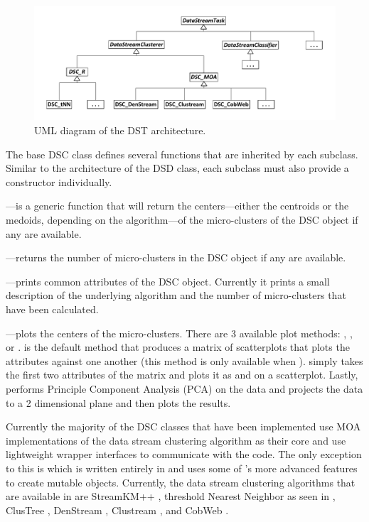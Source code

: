\documentclass[nojss]{jss}
\begin{document}
\begin{figure}
\centering
\includegraphics{dst_uml}
\caption{UML diagram of the DST architecture.}
\label{figure:dst}
\end{figure}

The base DSC class defines several functions that are inherited by each subclass. Similar to the architecture of the DSD class, each subclass must also provide a constructor individually.


%
---is a generic function that will return the centers---either the centroids or the medoids, depending on the algorithm---of the micro-clusters of the DSC object if any are available.


%
---returns the number of micro-clusters in the DSC object if any are available.


%
---prints common attributes of the DSC object. Currently it prints a small description of the underlying algorithm and the number of micro-clusters that have been calculated.


%
---plots the centers of the micro-clusters. There are 3 available plot methods: , , or .  is the default method that produces a matrix of scatterplots that plots the attributes against one another (this method is only available when ).  simply takes the first two attributes of the matrix and plots it as  and  on a scatterplot. Lastly,  performs Principle Component Analysis (PCA) on the data and projects the data to a 2 dimensional plane and then plots the results.

Currently the majority of the DSC classes that have been implemented use MOA implementations of the data stream clustering algorithm as their core and use lightweight  wrapper interfaces to communicate with the  code. The only exception to this is  which is written entirely in  and uses some of 's more advanced features to create mutable objects. Currently, the data stream clustering algorithms that are available in  are StreamKM++ \citep{stream:Ackermann+Lammersen+Maertens+Raupach:2010}, threshold Nearest Neighbor as seen in \citep{stream:Hahsler+Dunham:2010, stream:Hahsler+Dunham:2010b}, ClusTree \citep{stream:Kranen+Assent+Baldauf+Seidl:2009}, DenStream \citep{stream:Cao+Ester+Qian+Zhou:2006}, Clustream \citep{stream:Aggarwal+Han+Wang+Yu:2003}, and CobWeb \citep{stream:Fisher:1987}.
\end{document}
